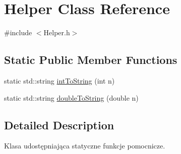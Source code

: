 \hypertarget{class_helper}{\section{\-Helper \-Class \-Reference}
\label{class_helper}
}


{\ttfamily \#include $<$\-Helper.\-h$>$}

\subsection*{\-Static \-Public \-Member \-Functions}
\begin{DoxyCompactItemize}
\item 
static std\-::string \hyperlink{class_helper_aea19db1a4a7d6d3d793584fe8afab244}{int\-To\-String} (int n)
\item 
static std\-::string \hyperlink{class_helper_a43074fd7be9b2f43cc6e34941b25cc63}{double\-To\-String} (double n)
\end{DoxyCompactItemize}


\subsection{\-Detailed \-Description}
\-Klasa udostępniająca statyczne funkcje pomocnicze. 

